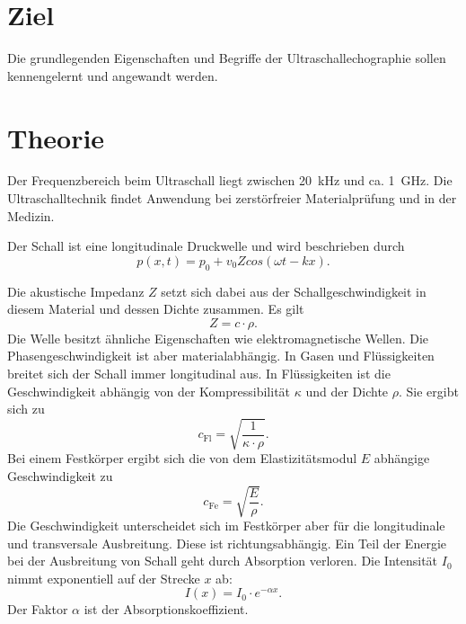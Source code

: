 \section{Ziel}

Die grundlegenden Eigenschaften und Begriffe der
Ultraschallechographie sollen kennengelernt und angewandt
werden.

\section{Theorie}
\label{sec:Theorie}
Der Frequenzbereich beim Ultraschall liegt zwischen 
\SI{20}{\kilo\hertz} und ca. \SI{1}{\giga\hertz}. 
Die Ultraschalltechnik findet Anwendung bei 
zerstörfreier Materialprüfung und in der Medizin. 

\noindent Der Schall ist eine longitudinale Druckwelle und wird 
beschrieben durch
\begin{equation*}
    p(x,t) = p_0 + v_0 Z cos(\omega t - kx).
\end{equation*}

\noindent Die akustische Impedanz $Z$ setzt sich dabei aus der 
Schallgeschwindigkeit in diesem Material und dessen Dichte 
zusammen. Es gilt 
\begin{equation*}
    Z = c \cdot \rho.
\end{equation*}
Die Welle besitzt ähnliche Eigenschaften wie 
elektromagnetische Wellen. Die Phasengeschwindigkeit 
ist aber materialabhängig. 
In Gasen und Flüssigkeiten breitet 
sich der Schall immer longitudinal aus. In Flüssigkeiten ist 
die Geschwindigkeit abhängig von der Kompressibilität 
$\kappa$ und der Dichte $\rho$. 
Sie ergibt sich zu 
\begin{equation*}
    c_{\text{Fl}}= \sqrt{\frac{1}{\kappa \cdot \rho}}.
\end{equation*}
Bei einem Festkörper ergibt sich die von dem Elastizitätsmodul
$E$ abhängige Geschwindigkeit zu 
\begin{equation*}
    c_{\text{Fe}}= \sqrt{\frac{E}{\rho}}.
\end{equation*}
Die Geschwindigkeit unterscheidet 
sich im Festkörper aber für die longitudinale und
transversale Ausbreitung. Diese ist richtungsabhängig.
Ein Teil der Energie bei der Ausbreitung von Schall geht 
durch Absorption verloren. Die Intensität $I_0$ nimmt 
exponentiell auf der Strecke $x$ ab:
\begin{equation}
    I(x)= I_0 \cdot e^{-\alpha x}.
    \label{eqn:I}
\end{equation}
Der Faktor $\alpha$ 
ist der Absorptionskoeffizient.

